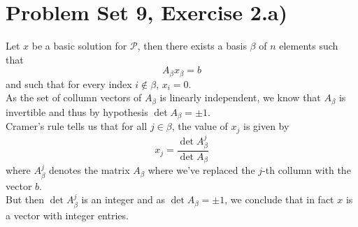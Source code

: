 \documentclass[11pt, a4paper]{article}
\begin{document}
\section{Problem Set 9, Exercise 2.a)}
Let $x$ be a basic solution for $ \mathcal{P}$, then there exists a basis $\beta$ of $n$ elements such that 
\[ 
A_\beta x_\beta = b
\]
and such that for every index $i\notin \beta$, $x_i=0$.\\
As the set of collumn vectors of $A_\beta$ is linearly independent, we know that $A_\beta$ is invertible and thus by hypothesis $\det A_\beta = \pm 1 $.\\
Cramer's rule tells us that for all $j\in \beta$, the value of $x_j$ is given by
\[ 
x_j = \frac{ \det A_\beta^{j}}{ \det A_\beta}
\]
where $A_\beta^{j}$ denotes the matrix $A_\beta$ where we've replaced the $j$-th collumn with the vector $b$.\\
But then $\det A_\beta^{j}$ is an integer and as $\det A_\beta= \pm 1$, we conclude that in fact $x$ is a vector with integer entries.
\end{document}
